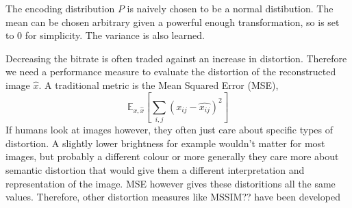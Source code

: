 
    

    The encoding distribution $P$ is naively chosen to be a normal distibution. The
    mean can be chosen arbitrary given a powerful enough transformation, so is
    set to 0 for simplicity. The variance is also learned.


    Decreasing the bitrate is often traded against an increase in distortion.
    Therefore we need a performance measure to evaluate the distortion of the
    reconstructed image $\hat{x}$. A traditional metric is the Mean Squared Error (MSE),
    \begin{equation}
        \mathbb{E}_{x, \hat{x}}[\sum_{i,j} (x_{ij} - \hat{x_{ij}})^2]
    \end{equation}
    If humans look at images however, they often just care about specific types
    of distortion. A slightly lower brightness for example wouldn't matter for
    most images, but probably a different colour or more generally they care
    more about semantic distortion that would give them a different
    interpretation and representation of the image. MSE however gives these
    distoritions all the same values. Therefore, other distortion measures like
    MSSIM?? have been developed

    

    
    


    
